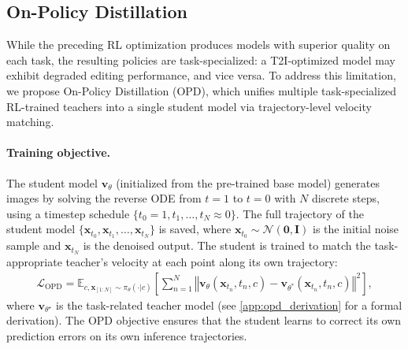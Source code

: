 \documentclass{llmxive}
\providecommand{\bm}[1]{\boldsymbol{#1}}
\providecommand{\mathbf}[1]{\bm{#1}}
\begin{document}
\subsection{On-Policy Distillation}
\label{sec:opd}

While the preceding RL optimization produces models with superior quality on each task, the resulting policies are task-specialized: a T2I-optimized model may exhibit degraded editing performance, and vice versa. To address this limitation, we propose On-Policy Distillation (OPD), which unifies multiple task-specialized RL-trained teachers into a single student model via trajectory-level velocity matching.

\paragraph{Training objective.} The student model $\mathbf{v}_\theta$ (initialized from the pre-trained base model) generates images by solving the reverse ODE from $t=1$ to $t=0$ with $N$ discrete steps, using a timestep schedule $\{t_0 = 1, t_1, \ldots, t_N \approx 0\}$. The full trajectory of the student model $\{\mathbf{x}_{t_0}, \mathbf{x}_{t_1}, \ldots, \mathbf{x}_{t_N}\}$ is saved, where $\mathbf{x}_{t_0} \sim \mathcal{N}(\mathbf{0}, \mathbf{I})$ is the initial noise sample and $\mathbf{x}_{t_N}$ is the denoised output. The student is trained to match the task-appropriate teacher's velocity at each point along its own trajectory:
\begin{align}
    \mathcal{L}_{\text{OPD}} = \mathbb{E}_{c,\mathbf{x}_{[1:N]}\sim \pi_\theta(\cdot|c)}\left[\sum_{n =1}^N \left\Vert \mathbf{v}_\theta(\mathbf{x}_{t_n}, t_n,c) - \mathbf{v}_{\theta^*}(\mathbf{x}_{t_n}, t_n,c) \right\Vert^2\right],
    \label{eq:opd_loss}
\end{align}
where $\mathbf{v}_{\theta^\star}$ is the task-related teacher model (see \cref{app:opd_derivation} for a formal derivation). The OPD objective ensures that the student learns to correct its own prediction errors on its own inference trajectories.
\end{document}
